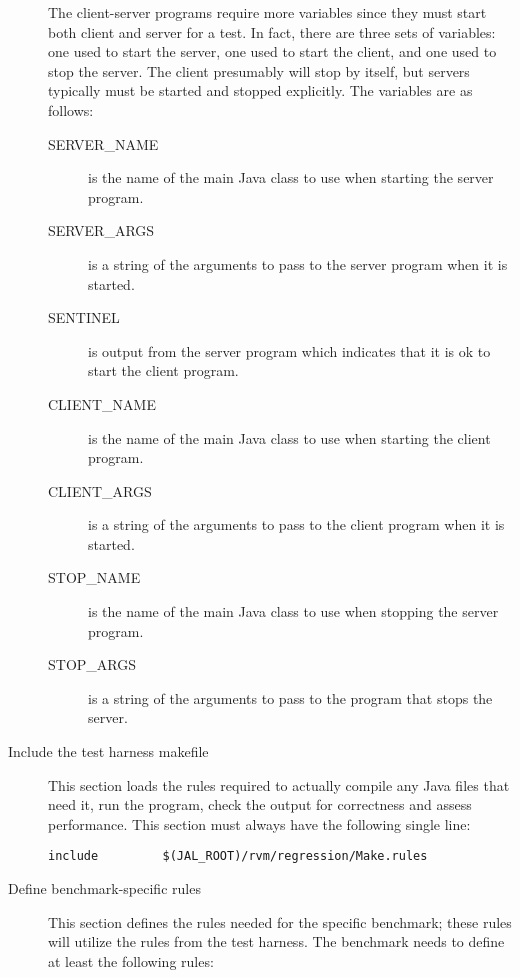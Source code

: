 \begin{description}
 The client-server programs require more variables since they must
start both client and server for a test.  In fact, there are three
sets of variables: one used to start the server, one used to start the
client, and one used to stop the server.  The client presumably will
stop by itself, but servers typically must be started and stopped
explicitly.  The variables are as follows:
\begin{description}
\item[SERVER\_NAME] is the name of the main Java class to use when
starting the server program.
\item[SERVER\_ARGS] is a string of the arguments to pass to the server
program when it is started.
\item[SENTINEL] is output from the server program which indicates that
it is ok to start the client program.
\item[CLIENT\_NAME] is the name of the main Java class to use when
starting the client program.
\item[CLIENT\_ARGS] is a string of the arguments to pass to the client
program when it is started.
\item[STOP\_NAME] is the name of the main Java class to use when
stopping the server program.
\item[STOP\_ARGS] is a string of the arguments to pass to the program
that stops the server.
\end{description}

\item[Include the test harness makefile]  This section loads the rules
required to actually compile any Java files that need it, run the
program, check the output for correctness and assess performance.
This section must always have the following single line:
\begin{verbatim}
include         $(JAL_ROOT)/rvm/regression/Make.rules
\end{verbatim}

\item[Define benchmark-specific rules]  This section defines the rules
needed for the specific benchmark; these rules will utilize the rules
from the test harness.  The benchmark needs to define at least the
following rules:
\begin{description}


\end{description}
\end{description}
